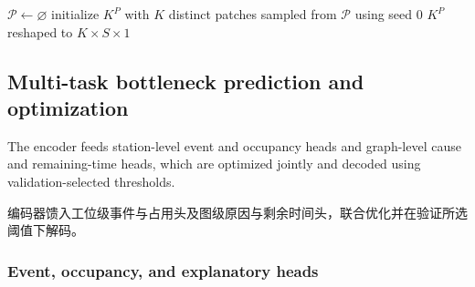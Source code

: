 \documentclass[a4paper,fleqn]{cas-dc}
\newcommand{\zhpara}[1]{%
  \par\begingroup\small\color{black!72}\noindent #1\par\endgroup}
\begin{document}
\begin{algorithm}[t]
\caption{Training-only temporal pattern clustering.}
\label{alg:pattern-bank}
$\mathcal{P}\leftarrow\varnothing$\;
initialize $K^P$ with $K$ distinct patches sampled from $\mathcal{P}$ using seed $0$\;
\Return $K^P$ reshaped to $K\times S\times1$\;
\end{algorithm}

\subsection{Multi-task bottleneck prediction and optimization}

The encoder feeds station-level event and occupancy heads and graph-level cause and remaining-time heads, which are optimized jointly and decoded using validation-selected thresholds.

\zhpara{编码器馈入工位级事件与占用头及图级原因与剩余时间头，联合优化并在验证所选阈值下解码。}


\subsubsection{Event, occupancy, and explanatory heads}
\end{document}
